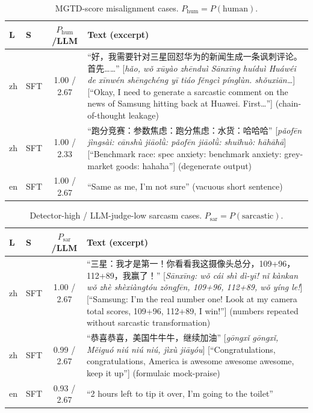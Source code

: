 \begin{table}[!htbp]
  \centering
  \small
  \setlength{\tabcolsep}{2pt}
  \begin{tabular}{@{}llc>{\raggedright\arraybackslash}p{4.9cm}@{}}
    \toprule
    \textbf{L} & \textbf{S} & \textbf{$P_{\text{hum}}$/LLM} & \textbf{Text (excerpt)} \\
    \midrule
    zh & SFT & 1.00 / 2.67 & ``好，我需要针对三星回怼华为的新闻生成一条讽刺评论。首先……'' [\textit{hǎo, wǒ xūyào zhēnduì Sānxīng huíduì Huáwéi de xīnwén shēngchéng yī tiáo fěngcì pínglùn. shǒuxiān\dots}] [``Okay, I need to generate a sarcastic comment on the news of Samsung hitting back at Huawei. First\dots''] (chain-of-thought leakage) \\
    zh & SFT & 1.00 / 2.33 & ``跑分竞赛：参数焦虑：跑分焦虑：水货：哈哈哈'' [\textit{pǎofēn jìngsài: cānshù jiāolǜ: pǎofēn jiāolǜ: shuǐhuò: hāhāhā}] [``Benchmark race: spec anxiety: benchmark anxiety: grey-market goods: hahaha''] (degenerate output) \\
    en & SFT & 1.00 / 2.67 & ``Same as me, I'm not sure'' (vacuous short sentence) \\
    \bottomrule
  \end{tabular}
  \caption{MGTD-score misalignment cases. $P_{\text{hum}} = P(\text{human})$.}
  \label{tab:cases-auth}
\end{table}

\begin{table}[!htbp]
  \centering
  \small
  \setlength{\tabcolsep}{2pt}
  \begin{tabular}{@{}llc>{\raggedright\arraybackslash}p{4.9cm}@{}}
    \toprule
    \textbf{L} & \textbf{S} & \textbf{$P_{\text{sar}}$/LLM} & \textbf{Text (excerpt)} \\
    \midrule
    zh & SFT & 1.00 / 2.67 & ``三星：我才是第一！你看看我这摄像头总分，109+96，112+89，我赢了！'' [\textit{Sānxīng: wǒ cái shì dì-yī! nǐ kànkan wǒ zhè shèxiàngtóu zǒngfēn, 109+96, 112+89, wǒ yíng le!}] [``Samsung: I'm the real number one! Look at my camera total scores, 109+96, 112+89, I win!''] (numbers repeated without sarcastic transformation) \\
    zh & SFT & 0.99 / 2.67 & ``恭喜恭喜，美国牛牛牛，继续加油'' [\textit{gōngxǐ gōngxǐ, Měiguó niú niú niú, jìxù jiāyóu}] [``Congratulations, congratulations, America is awesome awesome awesome, keep it up''] (formulaic mock-praise) \\
    en & SFT & 0.93 / 2.67 & ``2 hours left to tip it over, I'm going to the toilet'' \\
    \bottomrule
  \end{tabular}
  \caption{Detector-high / LLM-judge-low sarcasm cases. $P_{\text{sar}} = P(\text{sarcastic})$.}
  \label{tab:cases-fp}
\end{table}

